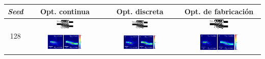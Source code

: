 \begin{landscape}
\begin{table}[ht]
    \centering
    \vspace*{-2.5cm}
    \hspace*{-5cm}
    \begin{tabular}{|c|c|c|c|}
    \hline 
    \emph{Seed} & Opt. continua & Opt. discreta &  Opt. de fabricación \\
    \hline
      \multirow{2}{*}{128} &
      \includegraphics[width=0.24\textwidth]{image/results/wdm/PSO/visualize_eps_cont_128.png} &
      \includegraphics[width=0.24\textwidth]{image/results/wdm/PSO/visualize_eps_disc_128.png} &
      \includegraphics[width=0.24\textwidth]{image/results/wdm/PSO/visualize_eps_fab_128.png} \\ 
      \cline{2-4}
      &
      \includegraphics[width=0.50\textwidth]{image/results/wdm/PSO/visualize_field_cont_128.png} &
      \includegraphics[width=0.50\textwidth]{image/results/wdm/PSO/visualize_field_disc_128.png} &
      \includegraphics[width=0.50\textwidth]{image/results/wdm/PSO/visualize_field_fab_128.png} \\

\end{tabular}
\end{table}
\end{landscape}
